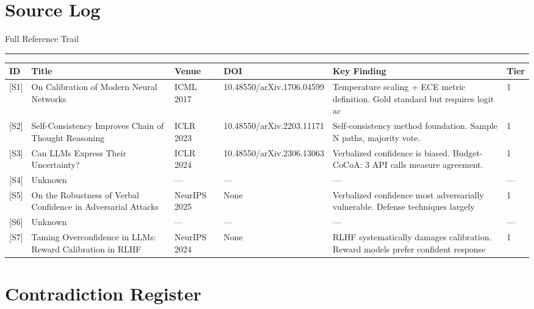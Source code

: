 \documentclass[a4paper,11pt]{article}
\newcommand{\ssubtitle}[1]{%
  \par\textcolor{subtitle}{\fontsize{12}{16}\selectfont #1}%
  \par\vspace{2pt}\textcolor{border}{\rule{\linewidth}{0.4pt}}\vspace{12pt}%
}
\begin{document}
\clearpage
\section{Source Log}
\ssubtitle{Full Reference Trail}

\begin{tabularx}{\linewidth}{@{}l X X X X X@{}}
\toprule
\textbf{ID} & \textbf{Title} & \textbf{Venue} & \textbf{DOI} & \textbf{Key Finding} & \textbf{Tier} \\
\midrule
\textcolor{primary}{[S1]} & On Calibration of Modern Neural Networks & ICML 2017 & 10.48550/arXiv.1706.04599 & Temperature scaling + ECE metric definition. Gold standard but requires logit ac & 1 \\
\textcolor{primary}{[S2]} & Self-Consistency Improves Chain of Thought Reasoning & ICLR 2023 & 10.48550/arXiv.2203.11171 & Self-consistency method foundation. Sample N paths, majority vote. & 1 \\
\textcolor{primary}{[S3]} & Can LLMs Express Their Uncertainty? & ICLR 2024 & 10.48550/arXiv.2306.13063 & Verbalized confidence is biased. Budget-CoCoA: 3 API calls measure agreement. & 1 \\
\textcolor{primary}{[S4]} & Unknown & — & — & — & — \\
\textcolor{primary}{[S5]} & On the Robustness of Verbal Confidence in Adversarial Attacks & NeurIPS 2025 & None & Verbalized confidence most adversarially vulnerable. Defense techniques largely & 1 \\
\textcolor{primary}{[S6]} & Unknown & — & — & — & — \\
\textcolor{primary}{[S7]} & Taming Overconfidence in LLMs: Reward Calibration in RLHF & NeurIPS 2024 & None & RLHF systematically damages calibration. Reward models prefer confident response & 1 \\
\bottomrule
\end{tabularx}
\vspace{8pt}


\section{Contradiction Register}
\end{document}
